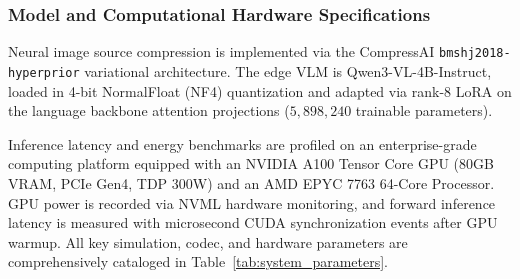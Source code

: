 \subsubsection{Model and Computational Hardware Specifications}
Neural image source compression is implemented via the CompressAI \texttt{bmshj2018-hyperprior} variational architecture. The edge VLM is Qwen3-VL-4B-Instruct, loaded in 4-bit NormalFloat (NF4) quantization and adapted via rank-8 LoRA on the language backbone attention projections ($5{,}898{,}240$ trainable parameters). 

Inference latency and energy benchmarks are profiled on an enterprise-grade computing platform equipped with an NVIDIA A100 Tensor Core GPU (80GB VRAM, PCIe Gen4, TDP 300W) and an AMD EPYC 7763 64-Core Processor. GPU power is recorded via NVML hardware monitoring, and forward inference latency is measured with microsecond CUDA synchronization events after GPU warmup. All key simulation, codec, and hardware parameters are comprehensively cataloged in Table~\ref{tab:system_parameters}.

